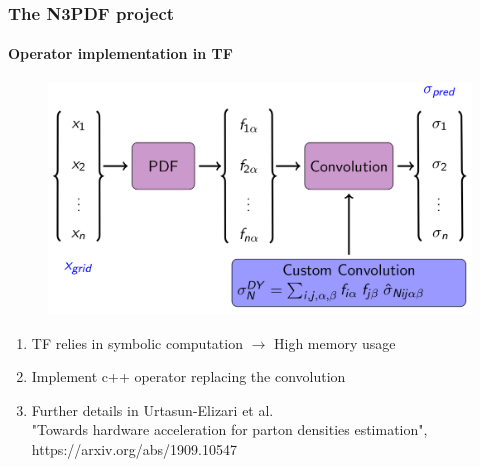 \documentclass[aspectratio=43]{beamer}
\begin{document}
\begin{frame}
	
	\frametitle{The N3PDF project}
	\framesubtitle{Operator implementation in TF}
	
	\begin{figure}
		\includegraphics[width = 8.5 cm]{plots/section2/TF_convolution2.png}
	\end{figure}
	
	\begin{enumerate}
		\item \footnotesize TF relies in symbolic computation $\longrightarrow$ High memory usage
		\item \footnotesize Implement c++ operator replacing the convolution
		\item Further details in Urtasun-Elizari et al.\\
		{\color{blue}"Towards hardware acceleration for parton densities estimation",\\ https://arxiv.org/abs/1909.10547}
	\end{enumerate}

\end{frame}
\end{document}
